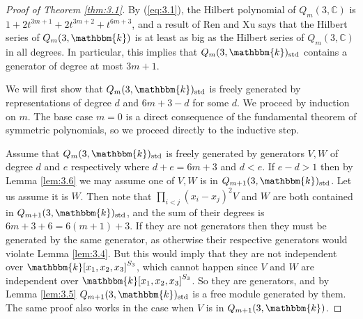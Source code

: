 \documentclass[11pt]{article}
\theoremstyle{definition}
\renewcommand{\k}{\mathbbm{k}}
\newcommand{\std}{\mathrm{std}}
\newcommand{\C}{\mathbb{C}}
\begin{document}
\begin{proof}[Proof of Theorem \ref{thm:3.1}]
    By (\ref{eq:3.1}), the Hilbert polynomial of $Q_m(3,\C)$ is $1+2t^{3m+1}+2t^{3m+2}+t^{6m+3}$, and a result of Ren and Xu \cite{Ren_2020} says that the Hilbert series of $Q_m(3,\k)$ is at least as big as the Hilbert series of $Q_m(3,\C)$ in all degrees. In particular, this implies that $Q_m(3,\k)_\std$ contains a generator of degree at most $3m+1$.
    
    We will first show that $Q_m(3,\k)_\std$ is freely generated by representations of degree $d$ and ${6m+3-d}$ for some $d$. We proceed by induction on $m$. The base case $m=0$ is a direct consequence of the fundamental theorem of symmetric polynomials, so we proceed directly to the inductive step.
    
    Assume that $Q_m(3,\k)_\std$ is freely generated by generators $V,W$ of degree $d$ and $e$ respectively where $d+e=6m+3$ and $d<e$. If $e-d>1$ then by Lemma \ref{lem:3.6} we may assume one of $V,W$ is in $Q_{m+1}(3,\k)_\std$. Let us assume it is $W$. Then note that $\prod_{i<j}(x_i-x_j)^2V$ and $W$ are both contained in $Q_{m+1}(3,\k)_\std$, and the sum of their degrees is $6m+3+6=6(m+1)+3$. If they are not generators then they must be generated by the same generator, as otherwise their respective generators would violate Lemma \ref{lem:3.4}. But this would imply that they are not independent over $\k[x_1,x_2,x_3]^{S_3}$, which cannot happen since $V$ and $W$ are independent over $\k[x_1,x_2,x_3]^{S_3}$. So they are generators, and by Lemma \ref{lem:3.5} $Q_{m+1}(3,\k)_\std$ is a free module generated by them. The same proof also works in the case when $V$ is in $Q_{m+1}(3,\k)$.
    

\end{proof}
\end{document}

